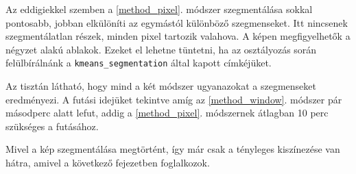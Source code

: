 Az eddigiekkel szemben a \ref{method_pixel}. módszer szegmentálása sokkal pontosabb, jobban elkülöníti az egymástól különböző szegmenseket. Itt nincsenek szegmentálatlan részek, minden pixel tartozik valahova. A képen megfigyelhetők a négyzet alakú ablakok. Ezeket el lehetne tüntetni, ha az osztályozás során felülbírálnánk a \texttt{kmeans\_segmentation} által kapott címkéjüket. 

Az tisztán látható, hogy mind a két módszer ugyanazokat a szegmenseket eredményezi. A futási idejüket tekintve amíg az \ref{method_window}. módszer pár másodperc alatt lefut, addig a \ref{method_pixel}. módszernek átlagban 10 perc szükséges a futásához.

Mivel a kép szegmentálása megtörtént, így már csak a tényleges kiszínezése van hátra, amivel a következő fejezetben foglalkozok.